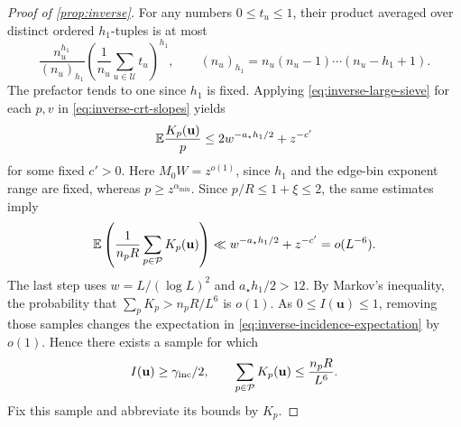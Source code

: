 \begin{proof}[Proof of \cref{prop:inverse}]
For any numbers \(0\le t_u\le1\), their product averaged over distinct
ordered \(h_1\)-tuples is at most
\[
 \frac{n_u^{h_1}}{(n_u)_{h_1}}
 \left(\frac1{n_u}\sum_{u\in\mathcal U}t_u\right)^{h_1},
 \qquad
 (n_u)_{h_1}=n_u(n_u-1)\cdots(n_u-h_1+1).
\]
The prefactor tends to one since \(h_1\) is fixed.
Applying \eqref{eq:inverse-large-sieve} for each \(p,v\) in
\eqref{eq:inverse-crt-slopes} yields
\begin{equation}
 \mathbb E\frac{K_p(\mathbf u)}p
 \le 2w^{-a_\star h_1/2}+z^{-c'}
 \label{eq:inverse-slopes-expectation}
\end{equation}
for some fixed \(c'>0\).
Here \(M_0W=z^{o(1)}\), since \(h_1\) and the edge-bin exponent range are
fixed, whereas \(p\ge z^{\alpha_{\min}}\).
Since \(p/R\le1+\xi\le2\), the same estimates imply
\[
 \mathbb E\left(\frac1{n_pR}\sum_{p\in\mathcal P}K_p(\mathbf u)\right)
 \ll w^{-a_\star h_1/2}+z^{-c'}
 =o(L^{-6}).
\]
The last step uses \(w=L/(\log L)^2\) and \(a_\star h_1/2>12\).
By Markov's inequality, the probability that
\(\sum_pK_p>n_pR/L^6\) is \(o(1)\).
As \(0\le I(\mathbf u)\le1\), removing those samples changes the
expectation in \eqref{eq:inverse-incidence-expectation} by \(o(1)\).
Hence there exists a sample for which
\begin{equation}
 I(\mathbf u)\ge\gamma_{\rm inc}/2,
 \qquad
 \sum_{p\in\mathcal P}K_p(\mathbf u)\le\frac{n_pR}{L^6}.
 \label{eq:inverse-good-sample}
\end{equation}
Fix this sample and abbreviate its bounds by \(K_p\).


\end{proof}
